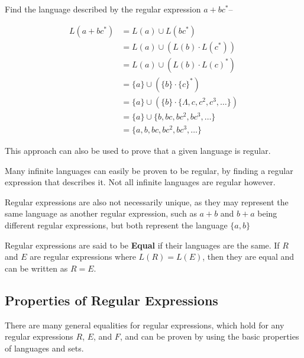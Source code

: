 \begin{example*}{}{}
  Find the language described by the regular expression $a + bc^*$--

  \begin{align*}
    L(a + bc^*) &= L(a) \cup L(bc^*)\\
    &= L(a) \cup (L(b) \cdot L(c^*))\\
    &= L(a) \cup (L(b) \cdot {L(c)}^*)\\
    &= \{a\} \cup (\{b\} \cdot {\{c\}}^*)\\
    &= \{a\} \cup (\{b\} \cdot \{\Lambda, c, c^2, c^3, \ldots\})\\
    &= \{a\} \cup \{b, bc, bc^2, bc^3, \ldots\}\\
    &= \{a, b, bc, bc^2, bc^3, \ldots\}
  \end{align*}
\end{example*}

This approach can also be used to prove that a given language is regular.

Many infinite languages can easily be proven to be regular, by finding a regular expression that describes it. Not all
 infinite languages are regular however.

Regular expressions are also not necessarily unique, as they may represent the same language as another regular expression,
 such as $a+b$ and $b+a$ being different regular expressions, but both represent the language $\{a, b\}$

\begin{definition*}{}{}
  Regular expressions are said to be \textbf{Equal} if their languages are the same. If $R$ and $E$ are regular expressions
   where $L(R) = L(E)$, then they are equal and can be written as $R = E$.
\end{definition*}

\subsection*{Properties of Regular Expressions}

There are many general equalities for regular expressions, which hold for any regular expressions $R$, $E$, and $F$, and
 can be proven by using the basic properties of languages and sets.

